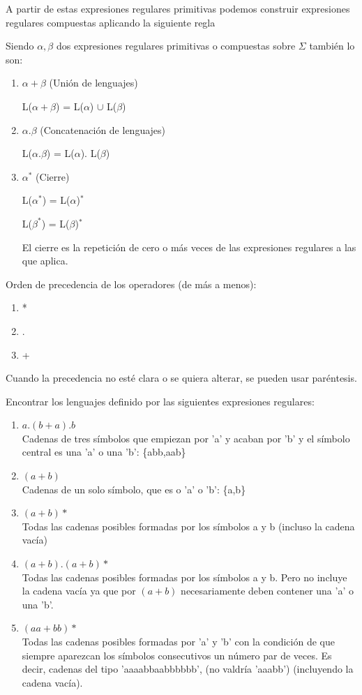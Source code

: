 \documentclass{apuntes}
\begin{document}
A partir de estas expresiones regulares primitivas podemos construir expresiones regulares compuestas aplicando la siguiente regla

Siendo $\alpha, \beta$ dos expresiones regulares primitivas o compuestas sobre $\Sigma$ también lo son:
\begin{enumerate}
\item $\alpha + \beta$ (Unión de lenguajes)

L($\alpha + \beta$) = L($\alpha $) $\cup$ L($\beta$)
\item $\alpha . \beta$ (Concatenación de lenguajes)

L($\alpha . \beta$) = L($\alpha $). L($\beta$)
\item $\alpha^*$ (Cierre)

L($\alpha^*$) = L($\alpha$)$^*$

L($\beta^*$) = L($\beta$)$^*$

El cierre es la repetición de cero o más veces de las expresiones regulares a las que aplica.
\end{enumerate}

\newpage
Orden de precedencia de los operadores (de más a menos):
\begin{enumerate}
\item *
\item .
\item +
\end{enumerate}
Cuando la precedencia no esté clara o se quiera alterar, se pueden usar paréntesis.

\begin{example}
Encontrar los lenguajes definido por las siguientes expresiones regulares:
\begin{enumerate}
\item$a.(b+a).b$\\
 Cadenas de tres símbolos que empiezan por 'a' y acaban por 'b' y el símbolo central es una 'a' o una 'b': \{abb,aab\}
\item $(a+b)$\\
Cadenas de un solo símbolo, que es o 'a' o 'b': \{a,b\}
\item $(a+b)*$\\
Todas las cadenas posibles formadas por los símbolos a y b (incluso la cadena vacía)
\item $(a+b).(a+b)*$ \\
Todas las cadenas posibles formadas por los símbolos a y b. Pero no incluye la cadena vacía ya que por $(a+b)$ necesariamente deben contener una 'a' o una 'b'.
\item $(aa+bb)*$ \\
Todas las cadenas posibles formadas por 'a' y 'b' con la condición de que siempre aparezcan los símbolos consecutivos un número par de veces. Es decir, cadenas del tipo 'aaaabbaabbbbbb', (no valdría 'aaabb') (incluyendo la cadena vacía).

\end{enumerate}

\end{example}
\end{document}
